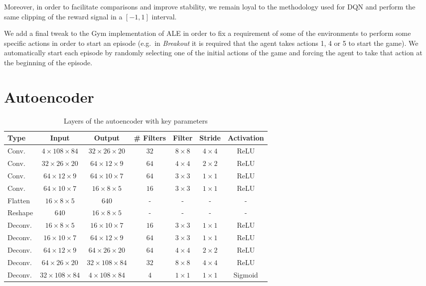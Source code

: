 Moreover, in order to facilitate comparisons and improve stability, we remain 
loyal to the methodology used for DQN and perform the same clipping of the 
reward signal in a $[-1, 1]$ interval. 

We add a final tweak to the Gym implementation of ALE in order to fix a 
requirement of some of the environments to perform some specific actions in 
order to start an episode (e.g.\ in \textit{Breakout} it is required that the 
agent takes actions 1, 4 or 5 to start the game). We automatically start each 
episode by randomly selecting one of the initial actions of the game and forcing
the agent to take that action at the beginning of the episode. 

\section{Autoencoder}
%
\begin{table}[h]
    \centering
    \begin{tabular}{l c c c c c c} 
	\hline
	Type & Input & Output & \# Filters & Filter & Stride & Activation \\ 
	\hline 
	Conv. & $4 \times 108 \times 84$ & $32 \times 26 \times 20$ & $32$ & $8 \times 8$ & $4 \times 4$ & ReLU \\ 
	Conv. & $32 \times 26 \times 20$ & $64 \times 12 \times 9$ & $64$ & $4 \times 4$ & $2 \times 2$ & ReLU \\ 
	Conv. & $64 \times 12 \times 9$ & $64 \times 10 \times 7$ & $64$ & $3 \times 3$ & $1 \times 1$ & ReLU \\ 
	Conv. & $64 \times 10 \times 7$ & $16 \times 8 \times 5$ & $16$ & $3 \times 3$ & $1 \times 1$ & ReLU \\ 
	Flatten	& $16 \times 8 \times 5$ & $640$ & - & - & - & - \\ 
	\hline
	Reshape & $640$ & $16 \times 8 \times 5$ & - & - & - & - \\
	Deconv. & $16 \times 8 \times 5$ & $16 \times 10 \times 7$ & $16$ & $3 \times 3$ & $1 \times 1$ & ReLU \\ 
	Deconv. & $16 \times 10 \times 7$ & $64 \times 12 \times 9$ & $64$ & $3 \times 3$ & $1 \times 1$ & ReLU \\
	Deconv. & $64 \times 12 \times 9$ & $64 \times 26 \times 20$ & $64$ & $4 \times 4$ & $2 \times 2$ & ReLU \\
	Deconv. & $64 \times 26 \times 20$ & $32 \times 108 \times 84$ & $32$ & $8 \times 8$ & $4 \times 4$ & ReLU \\
	Deconv. & $32 \times 108 \times 84$ & $4 \times 108 \times 84$ & $4$ & $1 \times 1$ & $1 \times 1$ & Sigmoid \\
	\hline
    \end{tabular}
    \caption{Layers of the autoencoder with key parameters}
    \label{t:AE_structure}
\end{table}
